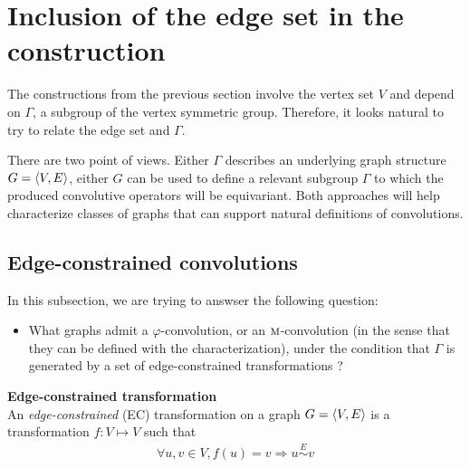 \section{Inclusion of the edge set in the construction}
\label{sec:edges}


The constructions from the previous section involve the vertex set $V$ and depend on $\Gamma$, a subgroup of the vertex symmetric group. Therefore, it looks natural to try to relate the edge set and $\Gamma$.

There are two point of views. Either $\Gamma$ describes an underlying graph structure $G = \langle V, E \rangle$, either $G$ can be used to define a relevant subgroup $\Gamma$ to which the produced convolutive operators will be equivariant. Both approaches will help characterize classes of graphs that can support natural definitions of convolutions.




\subsection{Edge-constrained convolutions}
\label{sec:cayley}

In this subsection, we are trying to answser the following question:
\begin{itemize}
	\item What graphs admit a $\varphi$-convolution, or an $\operatorname{\textsc{m}}$-convolution (in the sense that they can be defined with the characterization), under the condition that $\Gamma$ is generated by a set of edge-constrained transformations ?
\end{itemize}

\begin{definition}\textbf{Edge-constrained transformation}\\
An \emph{edge-constrained} (EC) transformation on a graph $G = \langle V, E \rangle$ is a transformation $f: V \mapsto V$ such that
\begin{gather*}
\forall u,v \in V, f(u) = v \Rightarrow u \overset{E}{\sim} v
\end{gather*}
\end{definition}

